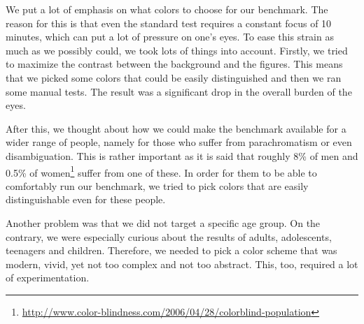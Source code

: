 We put a lot of emphasis on what colors to choose for our benchmark. The reason for this is that even the standard test requires a constant focus of 10 minutes, 
which can put a lot of pressure on one’s eyes. To ease this strain as much as we possibly could, we took lots of things into account. Firstly, we tried to maximize the contrast between the background and the figures. This means that we picked some colors that could be easily distinguished and then we ran some manual tests. The result was a significant drop in the overall burden of the eyes.

After this, we thought about how we could make the benchmark available for a wider range of people, namely for those who suffer from 
parachromatism or even
disambiguation. This is rather important as it is said that roughly 8\% of men and 0.5\% of 
women\footnote{\url{http://www.color-blindness.com/2006/04/28/colorblind-population}} suffer from one of these. 
In order for them to be able to comfortably run our benchmark, we tried 
to pick colors that are easily distinguishable even for these people.

Another problem was that we did not target a specific age group. On the contrary, we were especially curious about the results of adults, adolescents, teenagers and children. Therefore, we needed to pick a color scheme that was modern, vivid, yet not too complex and not too abstract. This, too, required a lot of experimentation.
